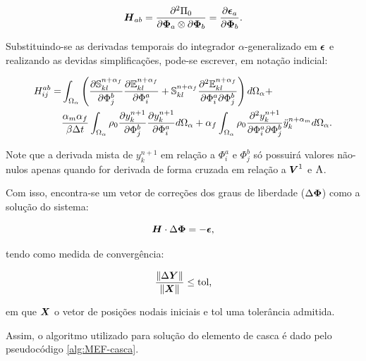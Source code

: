 \begin{equation}
    \boldsymbol{H}_{ab}=\frac{\partial^2\Pi_0}{\partial\boldsymbol{\Phi}_a\otimes\partial\boldsymbol{\Phi}_b}=\frac{\partial{\boldsymbol{\epsilon}_a}}{\partial{\boldsymbol{\Phi}_b}}\text{.}
\end{equation}

Substituindo-se as derivadas temporais do integrador $\alpha$-generalizado em $\boldsymbol{\epsilon}$ e realizando as devidas simplificações, pode-se escrever, em notação indicial:

\begin{equation}
    \begin{split}
        H_{ij}^{ab}=&\int_{\Omega_\alpha}{\left({\frac{\partial{\boldsymbol{\mathbb{S}}^{n+\alpha_f}_{kl}}}{\partial{\Phi_j^b}}\frac{\partial{\mathbb{E}^{n+\alpha_f}_{kl}}}{\partial{\Phi_i^a}}+\boldsymbol{\mathbb{S}}^{n+\alpha_f}_{kl}\frac{\partial^2{\mathbb{E}^{n+\alpha_f}_{kl}}}{\partial{\Phi_i^a}\partial{\Phi_j^b}}}\right) d\Omega_\alpha}+\\
        &\frac{\alpha_m\alpha_f}{\beta\Delta t}\int_{\Omega_\alpha}{\rho_0\frac{\partial{y_k^{n+1}}}{\partial{\Phi_j^b}}\frac{\partial{y_k^{n+1}}}{\partial{\Phi_i^a}} d\Omega_\alpha}+\alpha_f\int_{\Omega_\alpha}{\rho_0\frac{\partial^2{y_k^{n+1}}}{\partial{\Phi_i^a}\partial{\Phi_j^b}}\ddot{y}_k^{n+\alpha_m} d\Omega_\alpha}\text{.}
    \end{split}
    \label{eq:CSD-Hijab}
\end{equation}

%

Note que a derivada mista de $y_k^{n+1}$ em relação a $\Phi_i^a$ e $\Phi_j^b$ só possuirá valores não-nulos apenas quando for derivada de forma cruzada em relação a $\boldsymbol{V}^1$ e $\mathrm{A}$.

Com isso, encontra-se um vetor de correções dos graus de liberdade ($\Delta\boldsymbol{\Phi}$) como a solução do sistema:

\begin{equation}
    \boldsymbol{H}\cdot\Delta\boldsymbol{\Phi}=-\boldsymbol{\epsilon}\text{,}
\end{equation}

\noindent tendo como medida de convergência:

\begin{equation}
    \frac{\left\lVert{\Delta\boldsymbol{Y}}\right\lVert}{\left\lVert{\boldsymbol{X}}\right\lVert}\leq\text{tol,}
    \label{eq:CSD-erro}
\end{equation}

\noindent em que $\boldsymbol{X}$ o vetor de posições nodais iniciais e tol uma tolerância admitida.

Assim, o algoritmo utilizado para solução do elemento de casca é dado pelo pseudocódigo \ref{alg:MEF-casca}.

